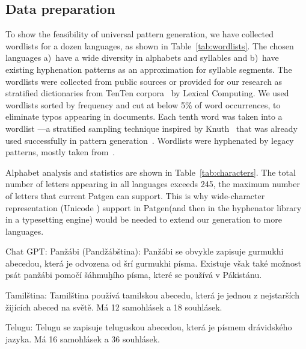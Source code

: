 \documentclass{csbulletin}
\let\program=\textrm %
\let\acro\relax
\providecommand\Dash{\unskip---}
\newcommand{\Patgen}{\program{Patgen}\xspace}
\begin{document}
\subsection{Data preparation}
To show the feasibility of universal pattern generation, we have collected wordlists for a dozen languages, as shown in Table~\ref{tab:wordlists}. 
The chosen languages \textrm{a)}~have a wide diversity in alphabets and syllables and \textrm{b)}~have existing hyphenation patterns as an approximation for syllable segments.
The wordlists were collected from public sources or provided for our research as stratified dictionaries from TenTen corpora~\cite{nlp:Jakubicek2013TTC} by Lexical Computing.
We used wordlists sorted by frequency and cut at below 5\% of word occurrences, to eliminate typos appearing in documents.
Each tenth word was taken into a wordlist \Dash a stratified sampling technique inspired by Knuth~\cite{tex:knuth91} that was already used successfully in pattern generation~\cite{tex:sojka95b}.
Wordlists were hyphenated by legacy patterns, mostly taken from~\cite{tex:hyphenationweb-2023-07-05}.

Alphabet analysis and statistics are shown in Table~\ref{tab:characters}.
The total number of letters appearing in all languages exceeds 245, the maximum number of letters that current \Patgen can support.
This is why wide-character representation (Unicode \mbox{\acro{UTF-16}}) support in \Patgen (and then in the hyphenator library in a typesetting engine) would be needed to extend our generation to more languages.

\iffalse
Chat GPT:
Panžábi (Pandžábština): Panžábi se obvykle zapisuje gurmukhi abecedou, která je odvozena od šrí gurmukhi písma. Existuje však také možnost psát panžábi pomočí šáhmuḫího písma, které se používá v Pákistánu.

Tamilština: Tamilština používá tamilskou abecedu, která je jednou z nejstarších žijících abeced na světě. Má 12 samohlásek a 18 souhlásek.

Telugu: Telugu se zapisuje teluguskou abecedou, která je písmem drávidského jazyka. Má 16 samohlásek a 36 souhlásek.
\end{document}
